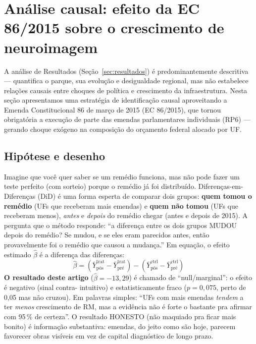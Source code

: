 \documentclass[12pt,a4paper,oneside]{article}
\begin{document}
\section{Análise causal: efeito da EC 86/2015 sobre o crescimento de neuroimagem}\label{sec:causal}

A análise de Resultados (Seção~\ref{sec:resultados}) é predominantemente
descritiva — quantifica o parque, sua evolução e desigualdade
regional, mas não estabelece relações causais entre choques de
política e crescimento da infraestrutura. Nesta seção apresentamos
uma estratégia de identificação causal aproveitando a Emenda
Constitucional 86 de março de 2015 (EC 86/2015), que tornou
obrigatória a execução de parte das emendas parlamentares
individuais (RP6) — gerando choque exógeno na composição do
orçamento federal alocado por UF.

\subsection{Hipótese e desenho}

\begin{tcolorbox}[colback=blue!4,colframe=blue!50!black,
                  sharp corners,boxrule=0.4pt,
                  title=\textbf{Em linguagem simples: o que é
                  Diferenças-em-Diferenças?},fonttitle=\small\bfseries]
\small
Imagine que você quer saber se um remédio funciona, mas não pode
fazer um teste perfeito (com sorteio) porque o remédio já foi
distribuído. Diferenças-em-Diferenças (DiD) é uma forma esperta
de comparar dois grupos: \textbf{quem tomou o remédio} (UFs que
receberam mais emendas) e \textbf{quem não tomou} (UFs que
receberam menos), \textit{antes} e \textit{depois} do remédio
chegar (antes e depois de 2015). A pergunta que o método
responde: ``a diferença entre os dois grupos MUDOU depois do
remédio? Se mudou, e se eles eram parecidos antes, então
provavelmente foi o remédio que causou a mudança.'' Em equação,
o efeito estimado $\hat\beta$ é a diferença das diferenças:
$$\hat\beta = (\bar{Y}^{\text{trat}}_{\text{pós}} -
              \bar{Y}^{\text{trat}}_{\text{pré}}) -
             (\bar{Y}^{\text{ctrl}}_{\text{pós}} -
              \bar{Y}^{\text{ctrl}}_{\text{pré}})$$
\textbf{O resultado deste artigo} ($\hat\beta = -13{,}29$) é
chamado de ``null/marginal'': o efeito é negativo (sinal contra-
intuitivo) e estatisticamente fraco ($p = 0{,}075$, perto de
0,05 mas não cruzou). Em palavras simples: ``UFs com mais
emendas \textit{tendem} a ter \textit{menos} crescimento de RM,
mas a evidência não é forte o bastante pra afirmar com 95\,\%
de certeza''. O resultado HONESTO (não maquiado pra ficar mais
bonito) é informação substantiva: emendas, do jeito como são
hoje, parecem favorecer obras visíveis em vez de capital
diagnóstico de longo prazo.
\end{tcolorbox}
\end{document}
